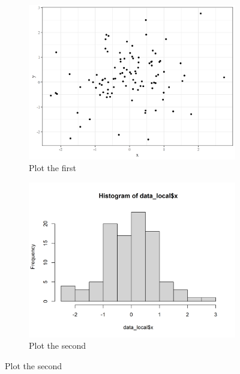 \documentclass[
]{article}
\begin{document}
\begin{figure}[H]
\begin{multicols}{2}
\begin{figure}[H]
\includegraphics[width = \linewidth]{mandatory_chunk_name-1.png}
\caption{Plot the first}
\label{fig:plotmeans}
\end{figure}

\columnbreak

\begin{figure}[H]
\includegraphics[width = \linewidth]{mandatory_chunk_name-2.png}
\centering
\caption{Plot the second}
\label{fig:histogram}
\end{figure}
\end{multicols}
\end{figure}
\end{document}
